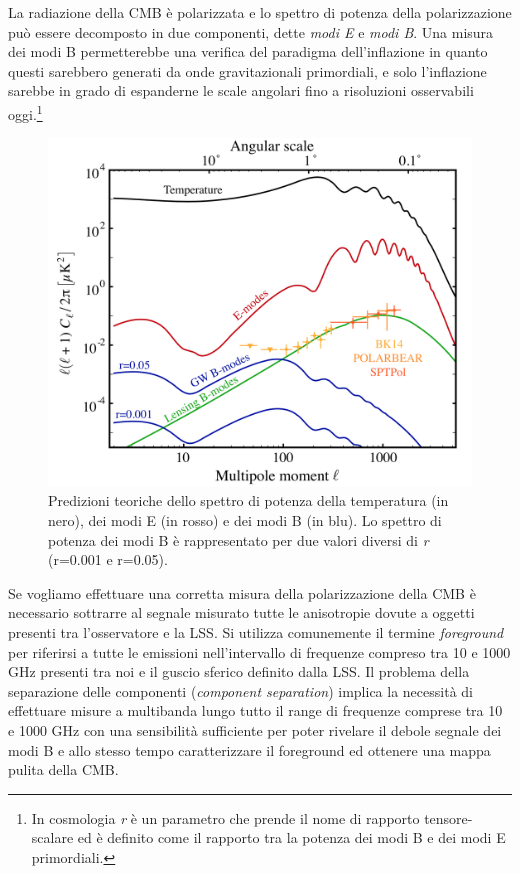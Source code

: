 \documentclass[12pt,a4paper,final]{book}
\begin{document}
La radiazione della CMB è polarizzata e lo spettro di potenza della polarizzazione può essere decomposto in due componenti, dette \textit{modi E} e \textit{modi B}. Una misura dei modi B permetterebbe una verifica del paradigma dell'inflazione in quanto questi sarebbero generati da onde gravitazionali primordiali, e solo l'inflazione sarebbe in grado di espanderne le scale angolari fino a risoluzioni osservabili oggi.\footnote{In cosmologia \textit{r} è un parametro che prende il nome di rapporto tensore-scalare ed è definito come il rapporto tra la potenza dei modi B e dei modi E primordiali.}
\begin{figure}[!ht]
	\centering
	\includegraphics[width=0.7\linewidth]{../figures/power_spect.png}
	\caption{Predizioni teoriche dello spettro di potenza della temperatura (in nero), dei modi E (in rosso) e dei modi B (in blu). Lo spettro di potenza dei modi B è rappresentato per due valori diversi di \textit{r} (r=0.001 e r=0.05)\cite{libro_CMB}.}
	\label{power_spect}
\end{figure}

Se vogliamo effettuare una corretta misura della polarizzazione della CMB è necessario sottrarre al segnale misurato tutte le anisotropie dovute a oggetti presenti tra l'osservatore e la LSS. Si utilizza comunemente il termine \textit{foreground} per riferirsi a tutte le emissioni nell'intervallo di frequenze compreso tra 10 e 1000 GHz presenti tra noi e il guscio sferico definito dalla LSS.
Il problema della separazione delle componenti (\textit{component separation}) implica la necessità di effettuare misure a multibanda lungo tutto il range di frequenze comprese tra 10 e 1000 GHz con una sensibilità sufficiente per poter rivelare il debole segnale dei modi B e allo stesso tempo caratterizzare il foreground ed ottenere una mappa pulita della CMB.
\end{document}
